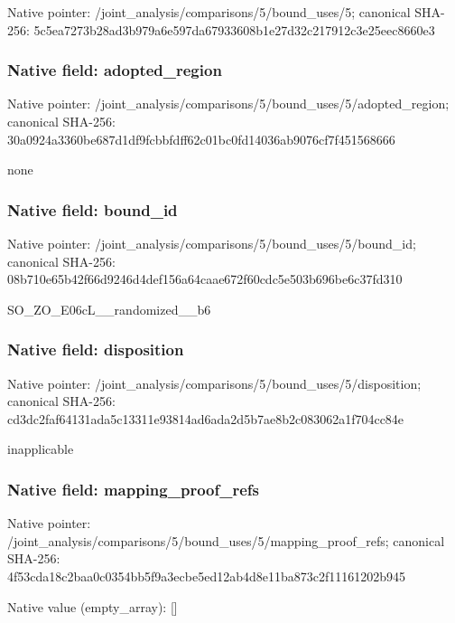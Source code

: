 \documentclass[10pt,a4paper]{article}
\begin{document}
Native pointer: /joint\_analysis/comparis\allowbreak{}ons/5/bound\_uses/5; canonical SHA-256: 5c5ea7273b28ad3b979a6e59\allowbreak{}7da67933608b1e27d32c2179\allowbreak{}12c3e25eec8660e3



\subsubsection{Native field: adopted\_region}


Native pointer: /joint\_analysis/comparis\allowbreak{}ons/5/bound\_uses/5/adopt\allowbreak{}ed\_region; canonical SHA-256: 30a0924a3360be687d1df9fc\allowbreak{}bbfdff62c01bc0fd14036ab9\allowbreak{}076cf7f451568666


none


\subsubsection{Native field: bound\_id}


Native pointer: /joint\_analysis/comparis\allowbreak{}ons/5/bound\_uses/5/bound\allowbreak{}\_id; canonical SHA-256: 08b710e65b42f66d9246d4de\allowbreak{}f156a64caae672f60cdc5e50\allowbreak{}3b696be6c37fd310


SO\_ZO\_E06cL\_\_randomized\_\_b6


\subsubsection{Native field: disposition}


Native pointer: /joint\_analysis/comparis\allowbreak{}ons/5/bound\_uses/5/dispo\allowbreak{}sition; canonical SHA-256: cd3dc2faf64131ada5c13311\allowbreak{}e93814ad6ada2d5b7ae8b2c0\allowbreak{}83062a1f704cc84e


inapplicable


\subsubsection{Native field: mapping\_proof\_refs}


Native pointer: /joint\_analysis/comparis\allowbreak{}ons/5/bound\_uses/5/mappi\allowbreak{}ng\_proof\_refs; canonical SHA-256: 4f53cda18c2baa0c0354bb5f\allowbreak{}9a3ecbe5ed12ab4d8e11ba87\allowbreak{}3c2f11161202b945



Native value (empty\_array): []
\end{document}
